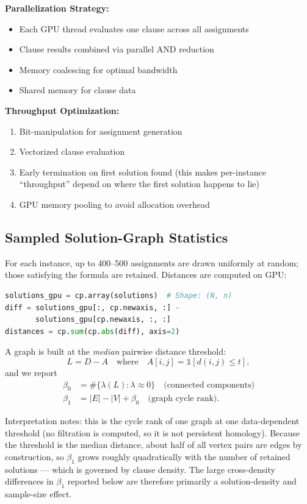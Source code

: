 \documentclass[11pt]{article}
\begin{document}
\textbf{Parallelization Strategy:}
\begin{itemize}
\item Each GPU thread evaluates one clause across all assignments
\item Clause results combined via parallel AND reduction
\item Memory coalescing for optimal bandwidth
\item Shared memory for clause data
\end{itemize}

\textbf{Throughput Optimization:}
\begin{enumerate}
\item Bit-manipulation for assignment generation
\item Vectorized clause evaluation
\item Early termination on first solution found (this makes per-instance
      ``throughput'' depend on where the first solution happens to lie)
\item GPU memory pooling to avoid allocation overhead
\end{enumerate}

\subsection{Sampled Solution-Graph Statistics}

For each instance, up to 400--500 assignments are drawn uniformly at random;
those satisfying the formula are retained. Distances are computed on GPU:
\begin{lstlisting}[language=Python]
solutions_gpu = cp.array(solutions)  # Shape: (N, n)
diff = solutions_gpu[:, cp.newaxis, :] -
       solutions_gpu[cp.newaxis, :, :]
distances = cp.sum(cp.abs(diff), axis=2)
\end{lstlisting}

A graph is built at the \emph{median} pairwise distance threshold:
\[
L = D - A \quad \text{where} \quad A[i,j] = \mathbb{1}[d(i,j) \leq t],
\]
and we report
\begin{align}
\beta_0 &= \#\{\lambda(L) : \lambda \approx 0\} \quad \text{(connected components)} \\
\beta_1 &= |E| - |V| + \beta_0 \quad \text{(graph cycle rank)}.
\end{align}

Interpretation notes: this is the cycle rank of one graph at one
data-dependent threshold (no filtration is computed, so it is not persistent
homology). Because the threshold is the median distance, about half of all
vertex pairs are edges by construction, so $\beta_1$ grows roughly
quadratically with the number of retained solutions --- which is governed by
clause density. The large cross-density differences in $\beta_1$ reported
below are therefore primarily a solution-density and sample-size effect.
\end{document}
